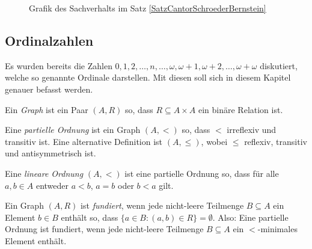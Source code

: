 \begin{figure}[h]
	\begin{center}
	\end{center}
	\caption{Grafik des Sachverhalts im Satz \ref{SatzCantorSchroederBernstein}}
	\label{CantorSchroederBernsteinGrafik}
\end{figure}


\subsection{Ordinalzahlen}

Es wurden bereits die Zahlen $0,1,2,\dots,n,\dots,\omega,\omega+1,\omega+2,\dots,\omega+\omega$ diskutiert, welche so genannte Ordinale darstellen. Mit diesen soll sich in diesem Kapitel genauer befasst werden.

\begin{definition}[Graph]
	Ein \textit{Graph} ist ein Paar $(A, R)$ so, dass $R\subseteq A\times A$ ein binäre Relation ist.
\end{definition}

\begin{definition}
	Eine \textit{partielle Ordnung} ist ein Graph $(A,<)$ so, dass $<$ irreflexiv und transitiv ist. Eine alternative Definition ist $(A,\leq)$, wobei $\leq$ reflexiv, transitiv und antisymmetrisch ist.
\end{definition}

Eine \textit{lineare Ordnung} $(A,<)$ ist eine partielle Ordnung so, dass für alle $a,b\in A$ entweder $a<b$, $a=b$ oder $b<a$ gilt.

Ein Graph $(A,R)$ ist \textit{fundiert}, wenn jede nicht-leere Teilmenge $B\subseteq A$ ein Element $b\in B$ enthält so, dass $\{a\in B : (a,b) \in R\}= \emptyset$.
Also: Eine partielle Ordnung ist fundiert, wenn jede nicht-leere Teilmenge $B\subseteq A$ ein $<$-minimales Element enthält.

